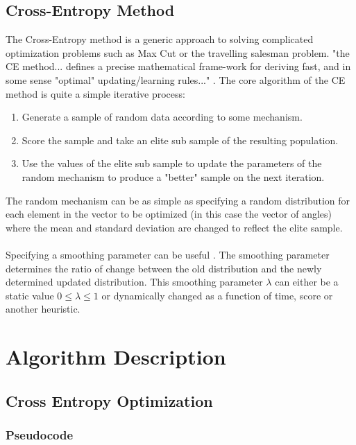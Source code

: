 \documentclass[11pt]{article}
\begin{document}
    \subsection{Cross-Entropy Method}
    The Cross-Entropy method is a generic approach to solving complicated optimization problems such as Max Cut or the travelling salesman problem. "the CE method... defines a precise mathematical frame-work for deriving fast, and in some sense "optimal" updating/learning rules..." \cite{CE}. The core algorithm of the CE method is quite a simple iterative process:
    \begin{enumerate}
        \item Generate a sample of random data according to some mechanism.
        \item Score the sample and take an elite sub sample of the resulting population.
        \item Use the values of the elite sub sample to update the parameters of the random mechanism to produce a "better" sample on the next iteration.
    \end{enumerate}
    The random mechanism can be as simple as specifying a random distribution for each element in the vector to be optimized (in this case the vector of angles) where the mean and standard deviation are changed to reflect the elite sample.
    \\\\
    Specifying a smoothing parameter can be useful \cite{CE2}. The smoothing parameter determines the ratio of change between the old distribution and the newly determined updated distribution. This smoothing parameter $\lambda$ can either be a static value $0 \leq \lambda \leq 1$ or dynamically changed as a function of time, score or another heuristic.

    \clearpage

    \section{Algorithm Description}
    \subsection{Cross Entropy Optimization}
    \subsubsection{Pseudocode}
    
\end{document}
